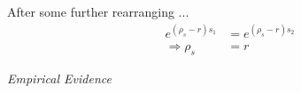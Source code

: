 \begin{frame}
After some further rearranging ...
\begin{align*}
e^{(\rho_s - r)s_1} & = e^{(\rho_s - r) s_2} \\
\Rightarrow \rho_s  & = r
\end{align*}
\end{frame}
\begin{frame}\begin{center}
\LARGE\textit{Empirical Evidence}
\end{center}\end{frame}
\begin{frame}[plain]
\begin{center}
\end{center}
\end{frame}
\begin{frame}[plain]
\begin{center}
\end{center}
\end{frame}
\begin{frame}[plain]
\begin{center}
\end{center}
\end{frame}
\begin{frame}[plain]
\begin{center}
\end{center}
\end{frame}

